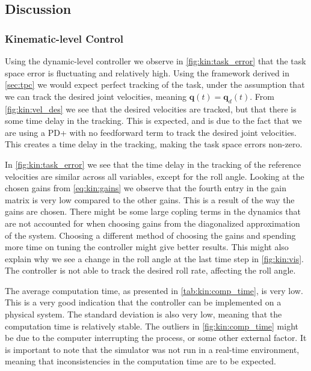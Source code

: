 \FloatBarrier
\subsection{Discussion}

\subsubsection{Kinematic-level Control}

Using the dynamic-level controller we observe in \autoref{fig:kin:task_error} that
the task space error is fluctuating and relatively high. Using the framework derived
in \autoref{sec:tpc} we would expect perfect tracking of the task, under the assumption
that we can track the desired joint velocities, meaning $\bm{q}(t) = \bm{q}_d(t)$.
From \autoref{fig:kin:vel_des} we see that the desired velocities are tracked,
but that there is some time delay in the tracking. This is expected, and is due
to the fact that we are using a PD+ with no feedforward term to track the desired
joint velocities. This creates a time delay in the tracking, making the task space
errors non-zero.

In \autoref{fig:kin:task_error} we see that the time delay in the tracking of the
reference velocities are similar across all variables, except for the roll angle.
Looking at the chosen gains from \autoref{eq:kin:gains} we observe that the fourth
entry in the gain matrix is very low compared to the other gains. This is a result
of the way the gains are chosen. There might be some large copling terms in the
dynamics that are not accounted for when choosing gains from the diagonalized
approximation of the system. Choosing a different method of choosing the gains
and spending more time on tuning the controller might give better results. This
might also explain why we see a change in the roll angle at the last time
step in \autoref{fig:kin:vis}. The controller is not able to track the desired
roll rate, affecting the roll angle.

The average computation time, as presented in \autoref{tab:kin:comp_time}, is very low.
This is a very good indication that the controller can be implemented on a physical
system. The standard deviation is also very low, meaning that the computation time
is relatively stable. The outliers in \autoref{fig:kin:comp_time} might be due to
the computer interrupting the process, or some other external factor. It is important
to note that the simulator was not run in a real-time environment, meaning that
inconsistencies in the computation time are to be expected.


